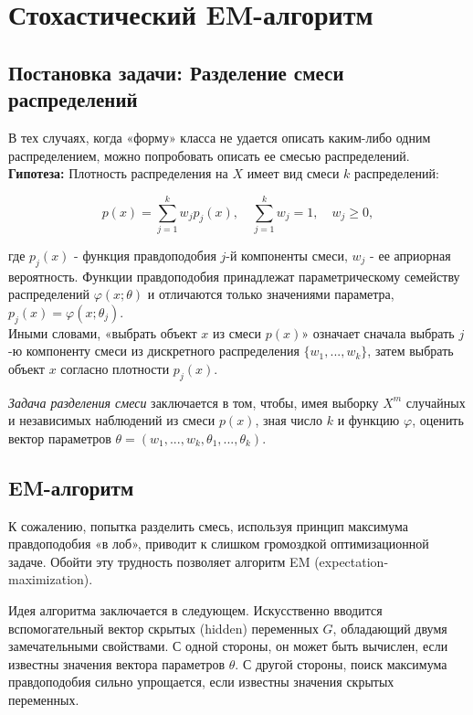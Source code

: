 \section*{Стохастический EM-алгоритм}

\subsection*{Постановка задачи: Разделение смеси распределений}

В тех случаях, когда «форму» класса не удается описать каким-либо одним распределением, можно попробовать описать ее смесью распределений. \\

\noindent
\textbf{Гипотеза:} Плотность распределения на $X$ имеет вид смеси $k$ распределений:

$$
    p(x) = \sum_{j=1}^{k} w_j p_j(x), \quad \sum_{j=1}^{k} w_j = 1, \quad w_j \geq 0,
$$

где $p_j(x)$ - функция правдоподобия $j$-й компоненты смеси, $w_j$ - ее априорная вероятность. Функции правдоподобия принадлежат параметрическому семейству распределений $\varphi(x; \theta)$ и отличаются только значениями параметра, $p_j(x) = \varphi(x; \theta_j)$.
\newline \\

Иными словами, «выбрать объект $x$ из смеси $p(x)$» означает сначала выбрать $j$-ю компоненту смеси из дискретного распределения $\{w_1, ..., w_k\}$, затем выбрать объект $x$ согласно плотности $p_j(x)$.

\textit{Задача разделения смеси} заключается в том, чтобы, имея выборку $X^m$ случайных и независимых наблюдений из смеси $p(x)$, зная число $k$ и функцию $\varphi$, оценить вектор параметров $\theta = (w_1, ..., w_k, \theta_1, ..., \theta_k)$.

\subsection*{EM-алгоритм}

К сожалению, попытка разделить смесь, используя принцип максимума правдоподобия «в лоб», приводит к слишком громоздкой оптимизационной задаче. Обойти эту трудность позволяет алгоритм EM (expectation-maximization).

Идея алгоритма заключается в следующем. Искусственно вводится вспомогательный вектор скрытых (hidden) переменных $G$, обладающий двумя замечательными свойствами. С одной стороны, он может быть вычислен, если известны значения вектора параметров $\theta$. С другой стороны, поиск максимума правдоподобия сильно упрощается, если известны значения скрытых переменных.

